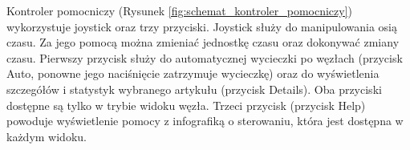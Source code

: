 
Kontroler pomocniczy (Rysunek \ref{fig:schemat_kontroler_pomocniczy}) wykorzystuje joystick oraz trzy przyciski. Joystick służy do manipulowania osią czasu. Za jego pomocą można zmieniać jednostkę czasu oraz dokonywać zmiany czasu. Pierwszy przycisk służy do automatycznej wycieczki po węzłach (przycisk Auto, ponowne jego naciśnięcie zatrzymuje wycieczkę) oraz do wyświetlenia szczegółów i statystyk wybranego artykułu (przycisk Details). Oba przyciski dostępne są tylko w trybie widoku węzła. Trzeci przycisk (przycisk Help) powoduje wyświetlenie pomocy z infografiką o sterowaniu, która jest dostępna w każdym widoku.

